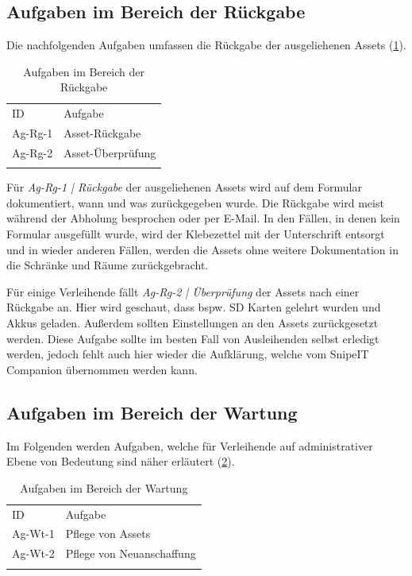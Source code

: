 \subsection{Aufgaben im Bereich der Rückgabe}
Die nachfolgenden Aufgaben umfassen die Rückgabe der ausgeliehenen Assets (\ref{table:Ag-Rg}).
\begin{table}[h]
        \centering
        \caption{Aufgaben im Bereich der Rückgabe}
        \begin{tabular}{ll}
                \arrayrulecolor{maincolor}\hline
                \sffamily\color{maincolor}ID & \sffamily\color{maincolor}Aufgabe \\
                \arrayrulecolor{maincolor}\hline
                Ag-Rg-1                      & Asset-Rückgabe                    \\
                Ag-Rg-2                      & Asset-Überprüfung                 \\
                \arrayrulecolor{maincolor}\hline
        \end{tabular}
        \label{table:Ag-Rg}
\end{table}

Für \textit{Ag-Rg-1 | Rückgabe} der ausgeliehenen Assets wird auf dem Formular dokumentiert, wann und was
zurückgegeben wurde. Die Rückgabe wird meist während der Abholung besprochen oder per E-Mail. In den
Fällen, in denen kein Formular ausgefüllt wurde, wird der Klebezettel mit der Unterschrift entsorgt
und in wieder anderen Fällen, werden die Assets ohne weitere Dokumentation in die Schränke und Räume
zurückgebracht.

Für einige Verleihende fällt \textit{Ag-Rg-2 | Überprüfung} der Assets nach einer Rückgabe an. Hier
wird geschaut, dass bspw. SD Karten gelehrt wurden und Akkus geladen. Außerdem sollten Einstellungen
an den Assets zurückgesetzt werden. Diese Aufgabe sollte im besten Fall von Ausleihenden selbst
erledigt werden, jedoch fehlt auch hier wieder die Aufklärung, welche vom SnipeIT Companion
übernommen werden kann.
\subsection{Aufgaben im Bereich der Wartung}
\label{subsec:wartung}
Im Folgenden werden Aufgaben, welche für Verleihende auf administrativer Ebene von Bedeutung sind
näher erläutert (\ref{table:Ag-Wt}).

\begin{table}[h]
        \centering
        \caption{Aufgaben im Bereich der Wartung}
        \begin{tabular}{ll}
                \arrayrulecolor{maincolor}\hline
                \sffamily\color{maincolor}ID & \sffamily\color{maincolor}Aufgabe \\
                \arrayrulecolor{maincolor}\hline
                Ag-Wt-1                      & Pflege von Assets                 \\
                Ag-Wt-2                      & Pflege von Neuanschaffung         \\
                \arrayrulecolor{maincolor}\hline
        \end{tabular}
        \label{table:Ag-Wt}
\end{table}

